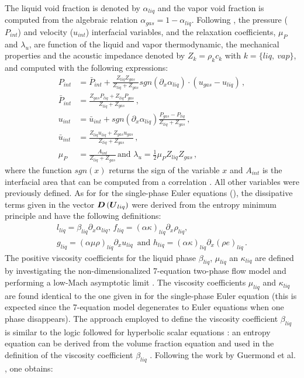 \documentclass{mc2015}
\begin{document}
%
The liquid void fraction is denoted by  $\alpha_{liq}$ and the vapor void fraction is computed from the algebraic relation $\alpha_{gas} = 1 - \alpha_{liq}$. Following \cite{SEM}, the pressure ($P_{int}$) and velocity ($u_{int}$) interfacial variables, and the relaxation coefficients, $\mu_P$ and $\lambda_u$, are function of the liquid and vapor thermodynamic, the mechanical properties and the acoustic impedance denoted by $Z_k = \rho_k c_k$ with $k = \{ liq, \ vap \}$, and computed with the following expressions:
%
\begin{subequations}
\label{eq:int_variables_def}
\begin{align}
  \label{E-R:83}
  P_{int} &= \bar{P}_{int} + \frac{Z_{liq}Z_{gas}}{Z_{liq}+Z_{gas}} sgn \left( \partial_x \alpha_{liq} \right) \cdot (u_{gas}-u_{liq}) \,,
  \\
  \bar{P}_{int} &= \frac{Z_{gas} P_{liq}+Z_{liq}P_{gas}}{Z_{liq}+Z_{gas}} \,,
 \\
  \label{E-R:84}
  u_{int} &= \bar{u}_{int} +  sgn \left( \partial_x \alpha_{liq}\right) \frac{P_{gas}-P_{liq}}{Z_{liq}+Z_{gas}} \,,
  \\
  \bar{u}_{int} &= \frac{Z_{liq} u_{liq}+Z_{gas} u_{gas}}{Z_{liq}+Z_{gas}} \, ,
  \\
  \mu_P &= \frac{A_{int}}{Z_{liq}+Z_{gas}} \, 
  \text{and }
  \lambda_u = \frac{1}{2} \mu_P Z_{liq} Z_{gas} \, ,
\end{align}
\end{subequations}
%
where the function $sgn(x)$ returns the sign of the variable $x$ and $A_{int}$ is the interfacial area that can be computed from a correlation \cite{SEM}. All other variables were previously defined. As for for the single-phase Euler equations (), the dissipative terms given in the vector $\boldsymbol D\left( \boldsymbol U_{liq} \right)$ were derived from the entropy minimum principle and have the following definitions:
%
\begin{multline}
l_{liq} = \beta_{liq} \partial_x \alpha_{liq} , \, f_{liq}= ( \alpha \kappa )_{liq} \partial_x \rho_{liq} , \\ g_{liq} = ( \alpha \mu \rho )_{liq} \partial_x u_{liq} \, \text{ and } h_{liq} = ( \alpha \kappa )_{liq} \partial_x \left( \rho e \right)_{liq} \, . \nonumber
\end{multline}
%
The positive viscosity coefficients for the liquid phase $\beta_{liq}$, $\mu_{liq}$ an $\kappa_{liq}$ are defined by investigating the non-dimensionalized 7-equation two-phase flow model and performing a low-Mach asymptotic limit \cite{Marco_paper_7_equ}. The viscosity coefficients $\mu_{liq}$ and $\kappa_{liq}$ are found identical to the one given in  for the single-phase Euler equation (this is expected since the 7-equation model degenerates to Euler equations when one phase disappears). The approach employed to define the viscosity coefficient $\beta_{liq}$ is similar to the logic followed for hyperbolic scalar equations \cite{jlg1, jlg2}: an entropy equation can be derived from the volume fraction equation and used in the definition of the viscosity coefficient $\beta_{liq}$ . Following the work by Guermond et al. \cite{jlg1, jlg2}, one obtains:
\end{document}

